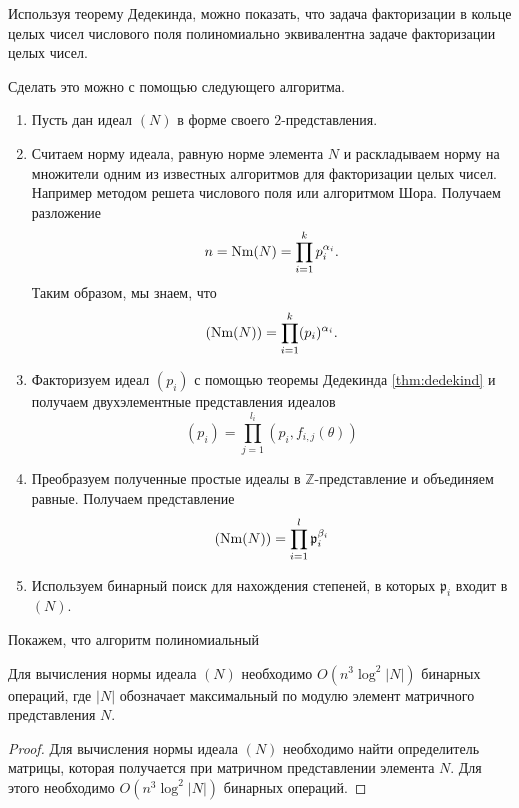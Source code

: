 \documentclass[_00_dissertation.tex]{subfiles}
\begin{document}
Используя теорему Дедекинда, можно показать, что задача факторизации в кольце целых чисел числового поля полиномиально эквивалентна задаче факторизации целых чисел.

Сделать это можно с помощью следующего алгоритма.

\begin{enumerate}
    \item Пусть дан идеал $(N)$ в форме своего $2$-представления.

    \item Считаем норму идеала, равную норме элемента $N$ и раскладываем норму на множители одним из известных алгоритмов для факторизации целых чисел.
    Например методом решета числового поля или алгоритмом Шора.
    Получаем разложение
    $$
        n = \textrm{Nm}(N) = \prod_{i=1}^{k} p_i^{\alpha_i}.
    $$
    Таким образом, мы знаем, что
    $$
        (\textrm{Nm}(N)) = \prod_{i=1}^{k} (p_i)^{\alpha_i}.
    $$

    \item Факторизуем идеал $(p_i)$ с помощью теоремы Дедекинда \ref{thm:dedekind} и получаем двухэлементные представления идеалов
    $$
        (p_i) = \prod_{j=1}^{l_i} (p_i, f_{i, j}(\theta))
    $$

    \item Преобразуем полученные простые идеалы в $\mathbb{Z}$-представление и объединяем равные.
    Получаем представление
    $$
        (\textrm{Nm}(N)) = \prod_{i=1}^{l} \mathfrak{p}_i^{\beta_i}
    $$

    \item Используем бинарный поиск для нахождения степеней, в которых $\mathfrak{p}_i$ входит в $(N)$.
\end{enumerate}

Покажем, что алгоритм полиномиальный

\begin{statement}
    Для вычисления нормы идеала $(N)$ необходимо $O(n^3 \log^2 |N|)$ бинарных операций, где $|N|$ обозначает максимальный по модулю элемент матричного представления $N$.
\end{statement}
\begin{proof}
    Для вычисления нормы идеала $(N)$ необходимо найти определитель матрицы, которая получается при матричном представлении элемента $N$.
    Для этого необходимо $O(n^3 \log^2 |N|)$ бинарных операций.
\end{proof}
\end{document}
